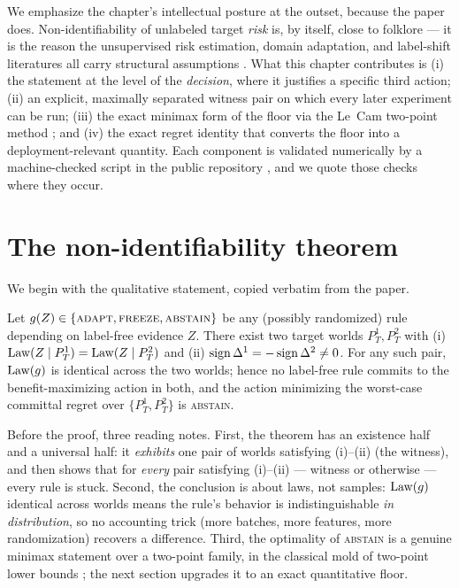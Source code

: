 We emphasize the chapter's intellectual posture at the outset, because the
paper does. Non-identifiability of unlabeled target \emph{risk} is, by
itself, close to folklore --- it is the reason the unsupervised risk
estimation, domain adaptation, and label-shift literatures all carry
structural assumptions \cite{bendavid2010theory, mansour2009domain,
lipton2018detecting}. What this chapter contributes is (i) the statement at
the level of the \emph{decision}, where it justifies a specific third
action; (ii) an explicit, maximally separated witness pair on which every
later experiment can be run; (iii) the exact minimax form of the floor via
the Le~Cam two-point method \cite{lecam1973convergence,
tsybakov2009introduction}; and (iv) the exact regret identity that converts
the floor into a deployment-relevant quantity. Each component is validated
numerically by a machine-checked script in the public repository
\cite{kbound2026repo}, and we quote those checks where they occur.

\section{The non-identifiability theorem}\label{sec:t1-imp}

We begin with the qualitative statement, copied verbatim from the paper.

\begin{theorem}\label{thm:imp}
Let $g(Z)\in\{\textsc{adapt},\textsc{freeze},\textsc{abstain}\}$ be any
(possibly randomized) rule depending on label-free evidence $Z$. There exist
two target worlds $P_T^1,P_T^2$ with
\textup{(i)} $\mathrm{Law}(Z\mid P_T^1)=\mathrm{Law}(Z\mid P_T^2)$ and
\textup{(ii)} $\operatorname{sign}\Delta^1=-\operatorname{sign}\Delta^2\neq 0$.
For any such pair, $\mathrm{Law}(g)$ is identical across the two worlds; hence no
label-free rule commits to the benefit-maximizing action in both, and the
action minimizing the worst-case committal regret over $\{P_T^1,P_T^2\}$ is
\textsc{abstain}.
\end{theorem}

Before the proof, three reading notes. First, the theorem has an
existence half and a universal half: it \emph{exhibits} one pair of worlds
satisfying (i)--(ii) (the witness), and then shows that for \emph{every}
pair satisfying (i)--(ii) --- witness or otherwise --- every rule is stuck.
Second, the conclusion is about laws, not samples: $\mathrm{Law}(g)$ identical
across worlds means the rule's behavior is indistinguishable \emph{in
distribution}, so no accounting trick (more batches, more features, more
randomization) recovers a difference. Third, the optimality of
\textsc{abstain} is a genuine minimax statement over a two-point family,
in the classical mold of two-point lower bounds
\cite{lecam1973convergence, tsybakov2009introduction}; the next section
upgrades it to an exact quantitative floor.

